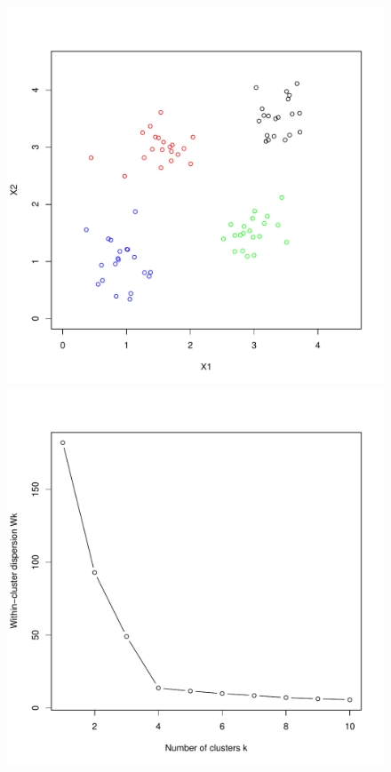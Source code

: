 \documentclass[11pt]{article}
\begin{document}
\begin{figure}
\begin{minipage}{\linewidth}
\centering
\begin{minipage}{0.45\linewidth}
\includegraphics[width=\linewidth]{figure/Data_example.pdf}
\end{minipage}
\hspace{0.05in}
\begin{minipage}{0.45\linewidth}
\includegraphics[width=\linewidth]{figure/W_k.pdf}
\end{minipage}
\end{minipage}


\end{figure}
\end{document}
